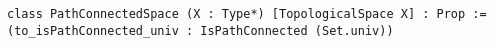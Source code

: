 \begin{lstlisting}[language=lean]
class PathConnectedSpace (X : Type*) [TopologicalSpace X] : Prop :=
(to_isPathConnected_univ : IsPathConnected (Set.univ))
\end{lstlisting}





